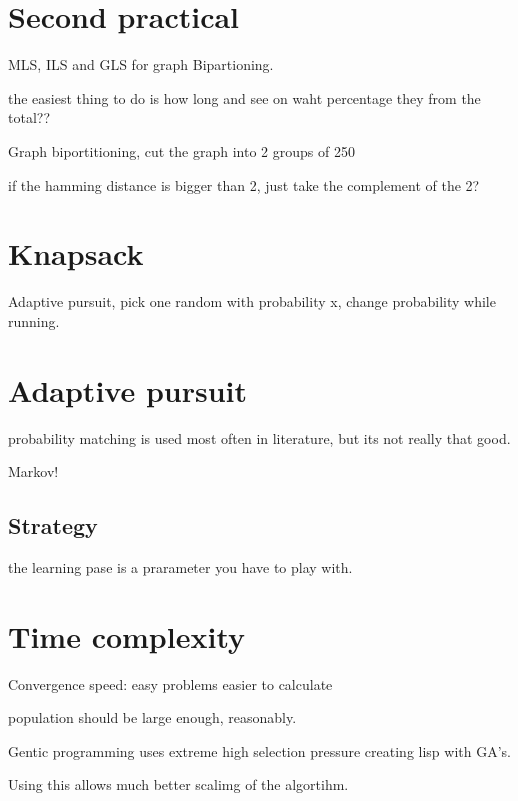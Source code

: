 \documentclass{article}
\begin{document}
\section{Second practical}

MLS, ILS and GLS for graph Bipartioning.

the easiest thing to do is how long and see on waht
percentage they from the total??


Graph biportitioning, cut the graph into 2 groups
of 250

if the hamming distance is bigger than 2, just take
the complement of the 2?

\section{Knapsack}
Adaptive pursuit, pick one random with probability x, change
probability while running.

\section{Adaptive pursuit}
probability matching is used most often in literature, but its not
really that good.

Markov!

\subsection{Strategy}
the learning pase is a prarameter you have to play with.

\section{Time complexity}
Convergence speed: easy problems easier to calculate

population should be large enough, reasonably.

Gentic programming uses extreme high selection pressure
	creating lisp with GA's.

Using this allows much better scalimg of the algortihm.
\end{document}
